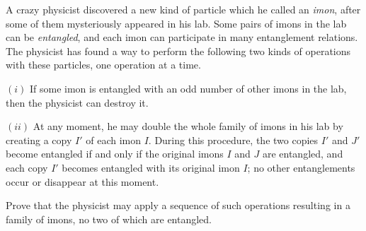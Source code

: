 A crazy physicist discovered a new kind of particle which he called an \emph{imon}, after some of them mysteriously appeared in his lab. Some pairs of imons in the lab can be \emph{entangled}, and each imon can participate in many entanglement relations. The physicist has found a way to perform the following two kinds of operations with these particles, one operation at a time.

$(i)$ If some imon is entangled with an odd number of other imons in the lab, then the physicist can destroy it.

$(ii)$ At any moment, he may double the whole family of imons in his lab by creating a copy $I'$ of each imon $I$. During this procedure, the two copies $I'$ and $J'$ become entangled if and only if the original imons $I$ and $J$ are entangled, and each copy $I'$ becomes entangled with its original imon $I$; no other entanglements occur or disappear at this moment.

Prove that the physicist may apply a sequence of such operations resulting in a family of imons, no two of which are entangled.
